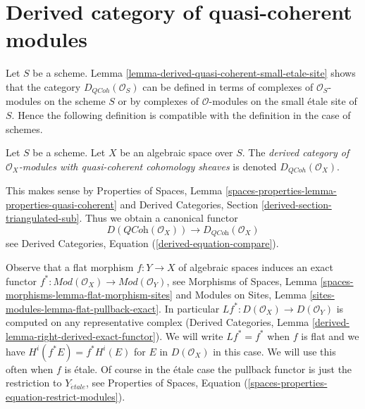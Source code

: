 \section{Derived category of quasi-coherent modules}
\label{section-derived-quasi-coherent}

\noindent
Let $S$ be a scheme. Lemma
\ref{lemma-derived-quasi-coherent-small-etale-site}
shows that the category $D_{QCoh}(\mathcal{O}_S)$ can be defined
in terms of complexes of $\mathcal{O}_S$-modules on the scheme $S$
or by complexes of $\mathcal{O}$-modules on the small \'etale site
of $S$. Hence the following definition is compatible with the definition
in the case of schemes.

\begin{definition}
\label{definition-derived-quasi-coherent}
Let $S$ be a scheme. Let $X$ be an algebraic space over $S$.
The {\it derived category of $\mathcal{O}_X$-modules with
quasi-coherent cohomology sheaves} is denoted
$D_{QCoh}(\mathcal{O}_X)$.
\end{definition}

\noindent
This makes sense by
Properties of Spaces, Lemma
\ref{spaces-properties-lemma-properties-quasi-coherent}
and
Derived Categories, Section \ref{derived-section-triangulated-sub}.
Thus we obtain a canonical functor
\begin{equation}
\label{equation-compare}
D(\textit{QCoh}(\mathcal{O}_X))
\longrightarrow
D_{\textit{QCoh}}(\mathcal{O}_X)
\end{equation}
see Derived Categories, Equation (\ref{derived-equation-compare}).

\medskip\noindent
Observe that a flat morphism $f : Y \to X$ of algebraic spaces
induces an exact functor
$f^* : \textit{Mod}(\mathcal{O}_X) \to \textit{Mod}(\mathcal{O}_Y)$,
see
Morphisms of Spaces, Lemma \ref{spaces-morphisms-lemma-flat-morphism-sites}
and
Modules on Sites, Lemma \ref{sites-modules-lemma-flat-pullback-exact}.
In particular $Lf^* : D(\mathcal{O}_X) \to D(\mathcal{O}_Y)$
is computed on any representative complex
(Derived Categories, Lemma \ref{derived-lemma-right-derived-exact-functor}).
We will write $Lf^* = f^*$ when $f$ is flat and we have
$H^i(f^*E) = f^*H^i(E)$ for $E$ in $D(\mathcal{O}_X)$ in this case.
We will use this often when $f$ is \'etale. Of course in the \'etale
case the pullback functor is just the restriction to $Y_{\acute{e}tale}$,
see Properties of Spaces, Equation
(\ref{spaces-properties-equation-restrict-modules}).

